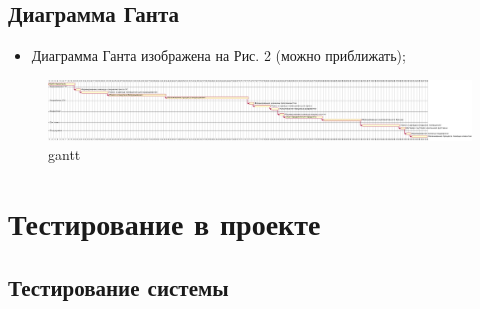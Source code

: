 \documentclass[a4paper,10pt]{article}
\begin{document}
\subsection{Диаграмма Ганта}

    \begin{itemize}
        \item Диаграмма Ганта изображена на Рис. 2 (можно приближать);
    \end{itemize}


    \begin{figure}[h]
        \centering
        \includegraphics[width=1\textwidth]{./pics/gantt.pdf}
        \caption{gantt}
    \end{figure}



\section{Тестирование в проекте}

    \subsection{Тестирование системы}
\end{document}
